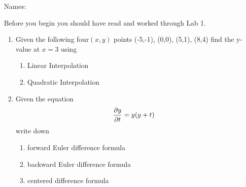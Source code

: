 \documentclass[12pt]{article}
\begin{document}
\begin{center}
Names:
\end{center}

Before you begin you should have read and worked through Lab 1.


\begin{enumerate}
\item Given the following four$ (x,y)$ points (-5,-1), (0,0), (5,1),
  (8,4) find the y-value at $x=3$ using
\begin{enumerate}
\item Linear Interpolation 
\vspace{2in}
\item Quadratic Interpolation
\vspace{2in}
\end{enumerate}
\item Given the equation
\begin{equation}
\frac {\partial y}{\partial t} = y(y+t)
\end{equation}
write down
\begin{enumerate}
\item forward Euler difference formula
\vspace{0.5in}
\item backward Euler difference formula
\vspace{0.5in}
\item centered difference formula
\end{enumerate}

\end{enumerate}
\end{document}
